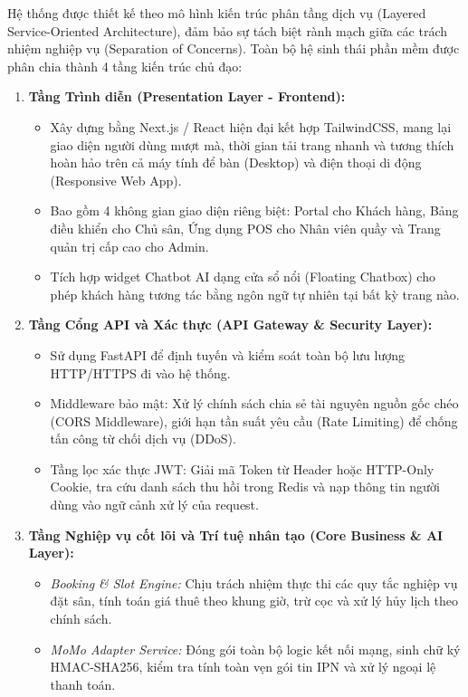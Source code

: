 Hệ thống được thiết kế theo mô hình kiến trúc phân tầng dịch vụ (Layered Service-Oriented Architecture), đảm bảo sự tách biệt rành mạch giữa các trách nhiệm nghiệp vụ (Separation of Concerns). Toàn bộ hệ sinh thái phần mềm được phân chia thành 4 tầng kiến trúc chủ đạo:

\begin{enumerate}[label=\arabic*.]
    \item \textbf{Tầng Trình diễn (Presentation Layer - Frontend):}
    \begin{itemize}
        \item Xây dựng bằng Next.js / React hiện đại kết hợp TailwindCSS, mang lại giao diện người dùng mượt mà, thời gian tải trang nhanh và tương thích hoàn hảo trên cả máy tính để bàn (Desktop) và điện thoại di động (Responsive Web App).
        \item Bao gồm 4 không gian giao diện riêng biệt: Portal cho Khách hàng, Bảng điều khiển cho Chủ sân, Ứng dụng POS cho Nhân viên quầy và Trang quản trị cấp cao cho Admin.
        \item Tích hợp widget Chatbot AI dạng cửa sổ nổi (Floating Chatbox) cho phép khách hàng tương tác bằng ngôn ngữ tự nhiên tại bất kỳ trang nào.
    \end{itemize}
    \item \textbf{Tầng Cổng API và Xác thực (API Gateway \& Security Layer):}
    \begin{itemize}
        \item Sử dụng FastAPI để định tuyến và kiểm soát toàn bộ lưu lượng HTTP/HTTPS đi vào hệ thống.
        \item Middleware bảo mật: Xử lý chính sách chia sẻ tài nguyên nguồn gốc chéo (CORS Middleware), giới hạn tần suất yêu cầu (Rate Limiting) để chống tấn công từ chối dịch vụ (DDoS).
        \item Tầng lọc xác thực JWT: Giải mã Token từ Header hoặc HTTP-Only Cookie, tra cứu danh sách thu hồi trong Redis và nạp thông tin người dùng vào ngữ cảnh xử lý của request.
    \end{itemize}
    \item \textbf{Tầng Nghiệp vụ cốt lõi và Trí tuệ nhân tạo (Core Business \& AI Layer):}
    \begin{itemize}
        \item \textit{Booking \& Slot Engine:} Chịu trách nhiệm thực thi các quy tắc nghiệp vụ đặt sân, tính toán giá thuê theo khung giờ, trừ cọc và xử lý hủy lịch theo chính sách.
        \item \textit{MoMo Adapter Service:} Đóng gói toàn bộ logic kết nối mạng, sinh chữ ký HMAC-SHA256, kiểm tra tính toàn vẹn gói tin IPN và xử lý ngoại lệ thanh toán.

\end{itemize}
\end{enumerate}
